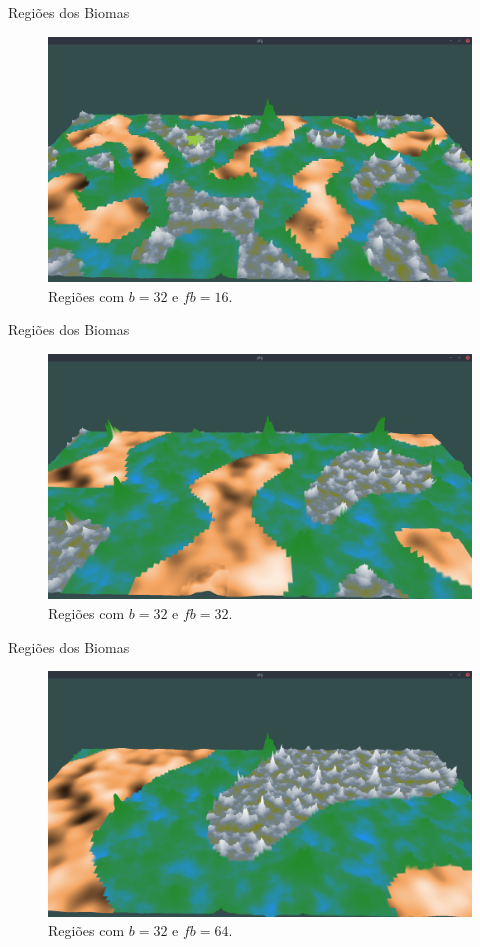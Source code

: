 \begin{frame}{Regiões dos Biomas}
    \begin{figure}[H]
        \centering
        \includegraphics[width=.9\textwidth]{img/re2bfb/fb/16b32.png}
        \caption{Regiões com $b = 32$ e $fb = 16$.}
        \label{fig:img_re2bfb_fb_16b32}
    \end{figure}
    
    
\end{frame}

\begin{frame}{Regiões dos Biomas}
    \begin{figure}[H]
        \centering
        \includegraphics[width=.9\textwidth]{img/re2bfb/fb/32b32.png}
        \caption{Regiões com $b = 32$ e $fb = 32$.}
        \label{fig:img_re2bfb_fb_32b32}
    \end{figure}
    
    
\end{frame}

\begin{frame}{Regiões dos Biomas}
    \begin{figure}[H]
        \centering
        \includegraphics[width=.9\textwidth]{img/re2bfb/fb/64b32.png}
        \caption{Regiões com $b = 32$ e $fb = 64$.}
        \label{fig:img_re2bfb_fb_64b32}
    \end{figure}
    
    
\end{frame}